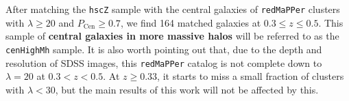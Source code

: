 \documentclass[a4paper,fleqn,usenatbib]{mnras}
\def\arcsec{{\prime\prime}}
\def\redm{\texttt{redMaPPer}}
\def\rbcg{\texttt{cenHighMh}}
\def\mhalo{{$M_{\mathrm{200b}}$}}
\def\logms{{$\log (M_{\star}/M_{\odot})$}}
\def\logmh{{$\log (M_{\mathrm{200b}}/M_{\odot})$}}
\begin{document}
 

    
    

 
    After matching the \texttt{hscZ} sample with the central galaxies of \redm{} 
    clusters with $\lambda \geq 20$ and $P_{\mathrm{Cen}} \geq 0.7$, we find 164 
    matched galaxies at $0.3 \leq z \leq 0.5$.
    This sample of \textbf{central galaxies in more massive halos} will be referred to 
    as the \rbcg{} sample. 
    It is also worth pointing out that, due to the depth and resolution of SDSS 
    images, this \redm{} catalog is not complete down to $\lambda=20$ at 
    $0.3 < z < 0.5$. 
    At $z\geq0.33$, it starts to miss a small fraction of clusters with $\lambda < 30$, 
    but the main results of this work will not be affected by this.
    
\end{document}
